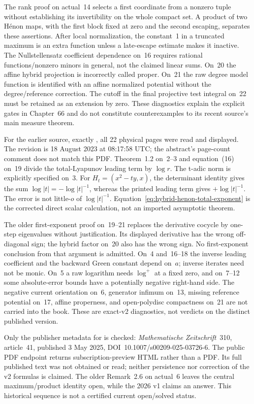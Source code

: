 The rank proof on actual~14 selects a first coordinate from a nonzero
tuple without establishing its invertibility on the whole compact set.
A product of two H\'enon maps, with the first block fixed at zero
and the second escaping, separates these assertions. After local
normalization, the constant~1 in a truncated maximum is an extra
function unless a late-escape estimate makes it inactive. The
Nullstellensatz coefficient dependence on~16 requires rational
functions/nonzero minors in general, not the claimed linear sums.
On~20 the affine hybrid projection is incorrectly called proper.
On~21 the raw degree model function is identified with an affine
normalized potential without the degree/reference correction.
The cutoff in the final projective test integral on~22 must be
retained as an extension by zero. These diagnostics explain the
explicit gates in Chapter~66 and do not constitute counterexamples
to its recent source's main measure theorem.

For the earlier source, exactly \cite{Irokawa23HenonV2}, all
22 physical pages were read and displayed. The revision is
18 August 2023 at 08:17:58 UTC; the abstract's page-count comment
does not match this PDF. Theorem~1.2 on~2--3 and equation~(16)
on~19 divide the total-Lyapunov leading term by $\log r$.
The t-adic norm is explicitly specified on~3. For
$H_t=(x^2-ty,x)$, the determinant identity gives the sum
$\log|t|=-\log|t|^{-1}$, whereas the printed leading term gives
$+\log|t|^{-1}$. The error is not little-$o$ of $\log|t|^{-1}$.
Equation~\eqref{eq:hybrid-henon-total-exponent} is the corrected
direct scalar calculation, not an imported asymptotic theorem.

The older first-exponent proof on~19--21 replaces the derivative
cocycle by one-step eigenvalues without justification. Its displayed
derivative has the wrong off-diagonal sign; the hybrid factor on~20
also has the wrong sign. No first-exponent conclusion from that
argument is admitted. On~4 and~16--18 the inverse leading coefficient
and the backward Green constant depend on~$a$; inverse iterates
need not be monic. On~5 a raw logarithm needs $\log^+$ at a fixed
zero, and on~7--12 some absolute-error bounds have a potentially
negative right-hand side. The negative current orientation on~6,
generator infimum on~13, missing reference potential on~17,
affine properness, and open-polydisc compactness on~21 are not
carried into the book. These are exact-v2 diagnostics, not verdicts
on the distinct published version.

Only the publisher metadata for \cite{Irokawa25HenonPublished}
is checked: \emph{Mathematische Zeitschrift}~310, article~41,
published 3 May 2025, DOI~10.1007/s00209-025-03726-6.
The public PDF endpoint returns subscription-preview HTML rather
than a PDF. Its full published text was not obtained or read;
neither persistence nor correction of the v2 formulas is claimed.
The older Remark~2.6 on actual~6 leaves the central maximum/product
identity open, while the 2026 v1 claims an answer. This historical
sequence is not a certified current open/solved status.

